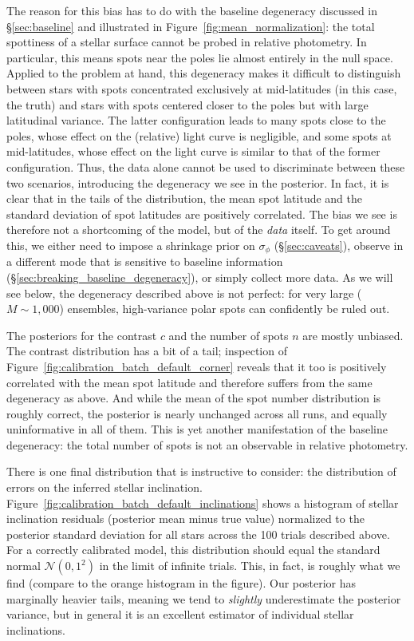 \documentclass[modern]{aastex62}
\begin{document}
The reason for this bias has to do with the baseline degeneracy discussed in
\S\ref{sec:baseline} and illustrated in Figure~\ref{fig:mean_normalization}:
the total spottiness of a stellar surface cannot be probed in relative
photometry. In particular, this means spots near the poles lie almost
entirely in the null space. Applied to the problem at hand, this degeneracy
makes it difficult to distinguish between stars with spots concentrated
exclusively at mid-latitudes (in this case, the truth) and
stars with spots centered closer to the poles but with large latitudinal
variance. The latter configuration leads to many spots close to the poles,
whose effect on the (relative) light curve is negligible, and some spots
at mid-latitudes, whose effect on the light curve is similar to that of
the former configuration.
Thus, the data alone cannot be used to discriminate between these two
scenarios, introducing the degeneracy we see in the posterior. In fact,
it is clear that in the tails of the distribution, the mean spot latitude
and the standard deviation of spot latitudes are positively correlated.
The bias we see is therefore not a shortcoming of the model, but of the
\emph{data} itself. To get around this, we either need to impose a
shrinkage prior on $\sigma_\phi$ (\S\ref{sec:caveats}),
observe in a different mode that is sensitive to baseline information
(\S\ref{sec:breaking_baseline_degeneracy}), or simply collect more data.
As we will see below, the degeneracy described above is not perfect:
for very large ($M \sim 1{,}000$) ensembles, high-variance polar spots
can confidently be ruled out.

The posteriors for the contrast $c$ and the number of spots $n$
are mostly unbiased. The contrast distribution has a bit of
a tail; inspection of Figure~\ref{fig:calibration_batch_default_corner}
reveals that it too is positively correlated with the mean spot latitude
and therefore suffers from the same degeneracy as above. And while the
mean of the spot number distribution is roughly correct, the posterior
is nearly unchanged across all runs, and equally uninformative in all
of them. This is yet another manifestation of the baseline degeneracy:
the total number of spots is not an observable in relative photometry.

There is one final distribution that is instructive to consider: the
distribution of errors on the inferred stellar inclination.
Figure~\ref{fig:calibration_batch_default_inclinations} shows a histogram
of stellar inclination residuals (posterior mean minus true value)
normalized to the posterior standard deviation for all stars across the
100 trials described above. For a correctly calibrated model, this distribution
should equal the standard normal $\mathcal{N}(0, 1^2)$ in the limit of
infinite trials. This, in fact, is roughly what we find (compare to the
orange histogram in the figure). Our posterior has marginally
heavier tails, meaning we tend to \emph{slightly} underestimate the
posterior variance, but in general it is an excellent estimator of
individual stellar inclinations.
\end{document}
